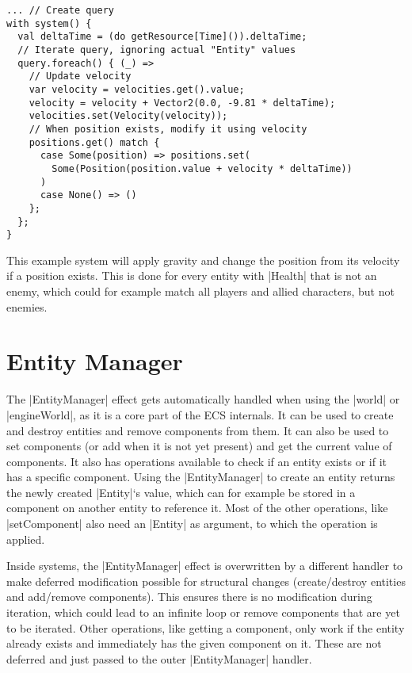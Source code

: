 \begin{lstlisting}[caption=System example for gravity]
... // Create query
with system() {
  val deltaTime = (do getResource[Time]()).deltaTime;
  // Iterate query, ignoring actual "Entity" values
  query.foreach() { (_) =>
    // Update velocity
    var velocity = velocities.get().value;
    velocity = velocity + Vector2(0.0, -9.81 * deltaTime);
    velocities.set(Velocity(velocity));
    // When position exists, modify it using velocity
    positions.get() match {
      case Some(position) => positions.set(
        Some(Position(position.value + velocity * deltaTime))
      )
      case None() => ()
    };
  };
}
\end{lstlisting}

This example system will apply gravity and change the position from its velocity if a position exists. This is done for every entity with |Health| that is not an enemy, which could for example match all players and allied characters, but not enemies.

\section{Entity Manager}

The |EntityManager| effect gets automatically handled when using the |world| or |engineWorld|, as it is a core part of the ECS internals. It can be used to create and destroy entities and remove components from them. It can also be used to set components (or add when it is not yet present) and get the current value of components. It also has operations available to check if an entity exists or if it has a specific component. Using the |EntityManager| to create an entity returns the newly created |Entity|`s value, which can for example be stored in a component on another entity to reference it. Most of the other operations, like |setComponent| also need an |Entity| as argument, to which the operation is applied.

Inside systems, the |EntityManager| effect is overwritten by a different handler to make deferred modification possible for structural changes (create/destroy entities and add/remove components). This ensures there is no modification during iteration, which could lead to an infinite loop or remove components that are yet to be iterated. Other operations, like getting a component, only work if the entity already exists and immediately has the given component on it. These are not deferred and just passed to the outer |EntityManager| handler.
